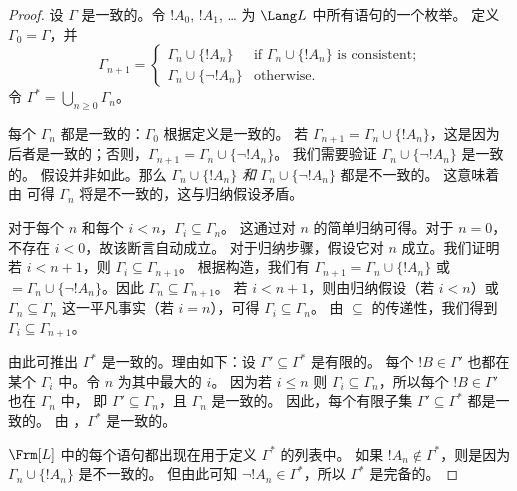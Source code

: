 \documentclass[../../../include/open-logic-section]{subfiles}
\begin{document}
\begin{proof}
设 $\Gamma$ 是一致的。令 $!A_0$, $!A_1$, \dots{} 为 $\Lang L$ 中所有语句的一个枚举。
定义 $\Gamma_0 = \Gamma$，并 \[
\Gamma_{n+1} =
\begin{cases}
\Gamma_n \cup \{ !A_n \} & \textrm{if $\Gamma_n \cup \{!A_n\}$ is
  consistent;} \\
\Gamma_n \cup \{ \lnot !A_n \} & \textrm{otherwise.}
\end{cases}
\] 令 $\Gamma^* = \bigcup_{n \geq 0} \Gamma_n$。

每个 $\Gamma_n$ 都是一致的：$\Gamma_0$ 根据定义是一致的。
若 $\Gamma_{n+1} = \Gamma_n \cup \{!A_n\}$，这是因为后者是一致的；否则，$\Gamma_{n+1} = \Gamma_n \cup \{\lnot
!A_n\}$。
我们需要验证 $\Gamma_n \cup \{\lnot !A_n\}$ 是一致的。
假设并非如此。那么 $\Gamma_n \cup
\{!A_n\}$ \emph{和} $\Gamma_n \cup \{\lnot !A_n\}$ 都是不一致的。
这意味着由
可得 $\Gamma_n$ 将是不一致的，这与归纳假设矛盾。

对于每个 $n$ 和每个 $i < n$，$\Gamma_i \subseteq \Gamma_n$。
这通过对 $n$ 的简单归纳可得。对于 $n=0$，不存在 $i < 0$，故该断言自动成立。
对于归纳步骤，假设它对 $n$ 成立。我们证明若 $i < n+1$，则 $\Gamma_i \subseteq
\Gamma_{n+1}$。
根据构造，我们有 $\Gamma_{n+1} = \Gamma_n \cup \{!A_n\}$ 或 $=
\Gamma_n \cup \{\lnot !A_n\}$。因此 $\Gamma_n \subseteq
\Gamma_{n+1}$。
若 $i < n+1$，则由归纳假设（若 $i < n$）或 $\Gamma_n \subseteq \Gamma_n$ 这一平凡事实（若 $i = n$），可得 $\Gamma_i \subseteq \Gamma_n$。
由 $\subseteq$ 的传递性，我们得到 $\Gamma_i \subseteq
\Gamma_{n+1}$。

由此可推出 $\Gamma^*$ 是一致的。理由如下：设 $\Gamma' \subseteq \Gamma^*$ 是有限的。
每个 $!B \in \Gamma'$ 也都在某个 $\Gamma_i$ 中。令 $n$ 为其中最大的 $i$。
因为若 $i \le n$ 则 $\Gamma_i \subseteq \Gamma_n$，所以每个 $!B \in \Gamma'$ 也在 $\Gamma_n$ 中，
即 $\Gamma' \subseteq \Gamma_n$，且 $\Gamma_n$ 是一致的。
因此，每个有限子集 $\Gamma' \subseteq \Gamma^*$ 都是一致的。
由 ，$\Gamma^*$ 是一致的。

$\Frm[L]$ 中的每个语句都出现在用于定义 $\Gamma^*$ 的列表中。
如果 $!A_n \notin \Gamma^*$，则是因为 $\Gamma_n \cup \{!A_n\}$ 是不一致的。
但由此可知 $\lnot !A_n \in \Gamma^*$，所以 $\Gamma^*$ 是完备的。
\end{proof}
\end{document}
